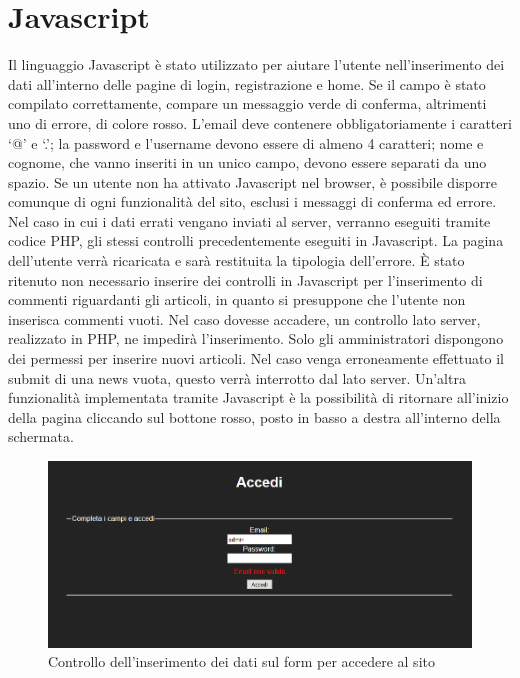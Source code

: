 \documentclass[10pt, a4paper]{article}
\begin{document}
\section{Javascript}
Il linguaggio Javascript è stato utilizzato per aiutare l’utente nell'inserimento dei dati all'interno delle pagine di login, registrazione e home. Se il campo è stato compilato correttamente, compare un messaggio verde di conferma, altrimenti uno di errore, di colore rosso. L’email deve contenere obbligatoriamente i caratteri ‘@’ e ‘.’;  la password e l'username devono essere di almeno 4 caratteri; nome e cognome, che vanno inseriti in un unico campo, devono essere separati da uno spazio. Se un utente non ha attivato Javascript nel browser, è possibile disporre comunque di ogni funzionalità del sito, esclusi i messaggi di conferma ed errore. Nel caso in cui i dati errati vengano inviati al server, verranno eseguiti tramite codice PHP, gli stessi controlli precedentemente eseguiti in Javascript. La pagina dell’utente verrà ricaricata e sarà restituita la tipologia dell’errore.
È stato ritenuto non necessario inserire dei controlli in Javascript per l'inserimento di commenti riguardanti gli articoli, in quanto si presuppone che l’utente non inserisca commenti vuoti. Nel caso dovesse accadere, un controllo lato server, realizzato in PHP, ne impedirà l’inserimento. Solo gli amministratori dispongono dei permessi per inserire nuovi articoli. Nel caso venga erroneamente effettuato il submit di una news vuota, questo verrà interrotto dal lato server. 
Un’altra funzionalità implementata tramite Javascript è la possibilità di ritornare all'inizio della pagina cliccando sul bottone rosso, posto in basso a destra all'interno della schermata.
\begin{figure}[h!]
 \centering
  \includegraphics[width=1\textwidth]{Images/loginjs.png}
  \caption{Controllo dell'inserimento dei dati sul form per accedere al sito}
  \label{fig:loginjs}
\end{figure}
\end{document}
